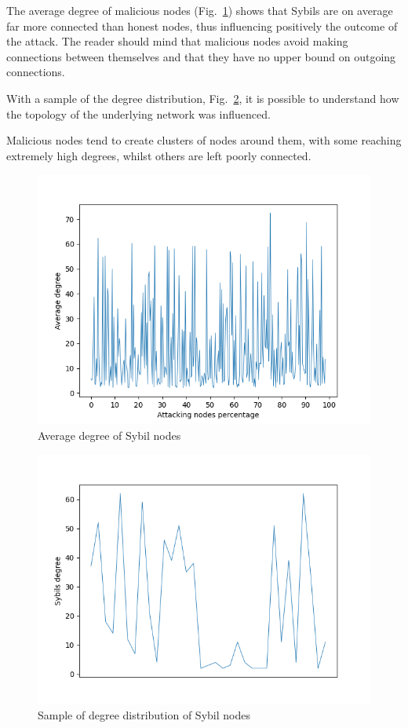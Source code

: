 \documentclass[12pt, letterpaper, twoside]{article}
\begin{document}
The average degree of malicious nodes (Fig.~\ref{fig:in-atk-degree}) shows that Sybils are on average far more connected than honest nodes, thus influencing positively the outcome of the attack. The reader should mind that malicious nodes avoid making connections between themselves and that they have no upper bound on outgoing connections.

With a sample of the degree distribution, Fig.~\ref{fig:incluster}, it is possible to understand how the topology of the underlying network was influenced. 

Malicious nodes tend to create clusters of nodes around them, with some reaching extremely high degrees, whilst others are left poorly connected.\\
\begin{figure}[h!]
	\includegraphics[width=.7\textwidth]{pict/results/in-atk-avg-degree.png}
	\centering
	\caption{Average degree of Sybil nodes}
	\label{fig:in-atk-degree}
\end{figure}

\begin{figure}[h!]
	\includegraphics[width=.7\textwidth]{pict/results/in-cluster.png}
	\centering
	\caption{Sample of degree distribution of Sybil nodes}
	\label{fig:incluster}
\end{figure}
\end{document}
